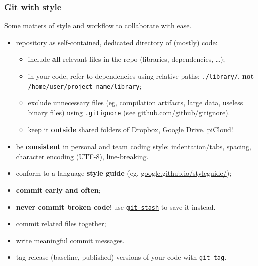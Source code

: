 \documentclass[10pt,svgnames]{beamer}
\begin{document}
\begin{frame}
\label{style}
\frametitle{Git with style}

Some matters of style and workflow to collaborate with ease.

\begin{itemize}[<+->]
\item repository as self-contained, dedicated directory of (mostly) code:
\begin{itemize}
  \item include \textbf{all} relevant files in the repo (libraries, dependencies, \ldots);
  \item in your code, refer to dependencies using relative paths: \lstinline{./library/}, \textbf{not} \lstinline{/home/user/project_name/library};
  \item exclude unnecessary files (eg, compilation artifacts, large data, useless binary files) using \texttt{.gitignore} (see \href{https://github.com/github/gitignore}{github.com/github/gitignore}).
  \item keep it \textbf{outside} shared folders of Dropbox, Google Drive, piCloud!
\end{itemize}
\item be \textbf{consistent} in personal and team coding style: indentation/tabs, spacing, character encoding (UTF-8), line-breaking.
\item conform to a language \textbf{style guide} (eg, \href{https://google.github.io/styleguide/}{google.github.io/styleguide/});
\item \textbf{commit early and often};
\item \textbf{never commit broken code}! use \href{https://git-scm.com/book/it/v2/Git-Tools-Stashing-and-Cleaning}{\lstinline{git stash}} to save it instead.
\item commit related files together;
\item write meaningful commit messages.
\item tag release (baseline, published) versions of your code with \lstinline{git tag}.
\end{itemize}

\end{frame}



\end{document}
